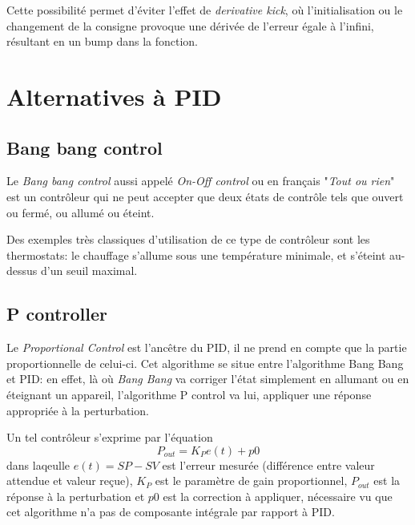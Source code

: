 Cette possibilité permet d'éviter l'effet de \emph{derivative kick}, où l'initialisation ou le changement de la consigne provoque une dérivée de l'erreur égale à l'infini, résultant en un bump dans la fonction.




\section{Alternatives à PID}

\subsection{Bang bang control}
Le \emph{Bang bang control} aussi appelé \emph{On-Off control} ou en français "\emph{Tout ou rien}" est un contrôleur qui ne peut accepter que deux états de contrôle tels que ouvert ou fermé, ou allumé ou éteint.

Des exemples très classiques d'utilisation de ce type de contrôleur sont les thermostats: le chauffage s'allume sous une température minimale, et s'éteint au-dessus d'un seuil maximal.

\subsection{P controller}
Le \emph{Proportional Control} est l'ancêtre du PID, il ne prend en compte que la partie proportionnelle de celui-ci.
Cet algorithme se situe entre l'algorithme Bang Bang et PID:
en effet, là où \emph{Bang Bang} va corriger l'état simplement en allumant ou en éteignant un appareil, l'algorithme P control va lui, appliquer une réponse appropriée à la perturbation.

Un tel contrôleur s'exprime par l'équation
\begin{equation}P_{out} = K_{P}e(t) + p0\end{equation}
dans laqeulle $e(t) = SP - SV$ est l'erreur mesurée (différence entre valeur attendue et valeur reçue), $K_{P}$ est le paramètre de gain proportionnel, $P_{out}$ est la réponse à la perturbation et $p0$ est la correction à appliquer, nécessaire vu que cet algorithme n'a pas de composante intégrale par rapport à PID.

